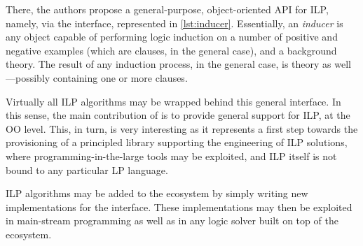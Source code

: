 \documentclass[12pt,a4paper,openright,twoside]{book}
\begin{document}


There, the authors propose a general-purpose, object-oriented API for ILP, namely, via the  interface, represented in \cref{lst:inducer}.
%
Essentially, an \emph{inducer} is any object capable of performing logic induction on a number of positive and negative examples (which are clauses, in the general case), and a background theory.
%
The result of any induction process, in the general case, is theory as well---possibly containing one or more clauses.

Virtually all ILP algorithms may be wrapped behind this general interface.
%
In this sense, the main contribution of \cite{Speciale2021} is to provide general support for ILP, at the OO level.
%
This, in turn, is very interesting as it represents a first step towards the provisioning of a principled library supporting the engineering of ILP solutions, where programming-in-the-large tools may be exploited, and ILP itself is not bound to any particular LP language.

ILP algorithms may be added to the ecosystem by simply writing new implementations for the  interface.
%
These implementations may then be exploited in main-stream programming as well as in any logic solver built on top of the \twopkt{} ecosystem.

%
%
%
%
%
%
\end{document}
